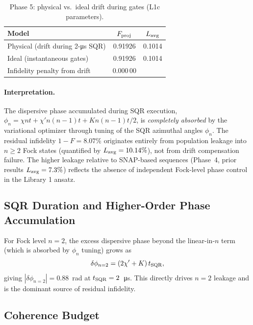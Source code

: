 \documentclass[11pt,a4paper]{article}
\newcommand{\Fproj}{F_{\rm proj}}
\newcommand{\Lavg}{L_{\rm avg}}
\begin{document}
\begin{table}[H]
  \centering
  \caption{Phase 5: physical vs.\ ideal drift during gates (L1c parameters).}
  \label{tab:phase5_drift}
  \begin{tabular}{lcc}
    \toprule
    Model & $\Fproj$ & $\Lavg$ \\
    \midrule
    Physical (drift during 2-\si{\micro s} SQR) & 0.91926 & 0.1014 \\
    Ideal (instantaneous gates)              & 0.91926 & 0.1014 \\
    \midrule
    Infidelity penalty from drift & 0.000\,00 & \\
    \bottomrule
  \end{tabular}
\end{table}

\paragraph{Interpretation.}
The dispersive phase accumulated during SQR execution,
$\phi_{n} = \chi n t + \chi' n(n-1) t + K n(n-1) t/2$,
is \emph{completely absorbed} by the variational optimizer through tuning of
the SQR azimuthal angles $\phi_n$.  The residual
infidelity $1-F = 8.07\%$ originates entirely from population leakage into
$n\geq 2$ Fock states (quantified by $\Lavg=10.14\%$), not from drift
compensation failure.  The higher leakage relative to SNAP-based sequences
(Phase~4, prior results $\Lavg=7.3\%$) reflects the absence of independent
Fock-level phase control in the Library 1 ansatz.

\subsection{SQR Duration and Higher-Order Phase Accumulation}

For Fock level $n=2$, the excess dispersive phase beyond the linear-in-$n$
term (which is absorbed by $\phi_n$ tuning) grows as
\begin{equation}
  \delta\phi_{n=2} = (2\chi' + K)\,t_{\rm SQR},
\end{equation}
giving $|\delta\phi_{n=2}| = 0.88$~rad at $t_{\rm SQR}=2$~\si{\micro s}.
This directly drives $n=2$ leakage and is the dominant source of residual
infidelity.

\subsection{Coherence Budget}
\end{document}
